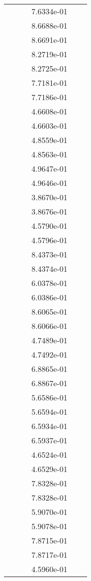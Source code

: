 \begin{xltabular}{\textwidth}{r|rS[table-format=1.3e+2]S[table-format=1.4e+2]S[table-format=1.4e+2]S[table-format=-1.5]}
&  &  & 7.6334e-01 & & \\
&  &  & 8.6688e-01 & & \\
&  &  & 8.6691e-01 & & \\
&  &  & 8.2719e-01 & & \\
&  &  & 8.2725e-01 & & \\
&  &  & 7.7181e-01 & & \\
&  &  & 7.7186e-01 & & \\
&  &  & 4.6608e-01 & & \\
&  &  & 4.6603e-01 & & \\
&  &  & 4.8559e-01 & & \\
&  &  & 4.8563e-01 & & \\
&  &  & 4.9647e-01 & & \\
&  &  & 4.9646e-01 & & \\
&  &  & 3.8670e-01 & & \\
&  &  & 3.8676e-01 & & \\
&  &  & 4.5790e-01 & & \\
&  &  & 4.5796e-01 & & \\
&  &  & 8.4373e-01 & & \\
&  &  & 8.4374e-01 & & \\
&  &  & 6.0378e-01 & & \\
&  &  & 6.0386e-01 & & \\
&  &  & 8.6065e-01 & & \\
&  &  & 8.6066e-01 & & \\
&  &  & 4.7489e-01 & & \\
&  &  & 4.7492e-01 & & \\
&  &  & 6.8865e-01 & & \\
&  &  & 6.8867e-01 & & \\
&  &  & 5.6586e-01 & & \\
&  &  & 5.6594e-01 & & \\
&  &  & 6.5934e-01 & & \\
&  &  & 6.5937e-01 & & \\
&  &  & 4.6524e-01 & & \\
&  &  & 4.6529e-01 & & \\
&  &  & 7.8328e-01 & & \\
&  &  & 7.8328e-01 & & \\
&  &  & 5.9070e-01 & & \\
&  &  & 5.9078e-01 & & \\
&  &  & 7.8715e-01 & & \\
&  &  & 7.8717e-01 & & \\
&  &  & 4.5960e-01 & & \\

\end{xltabular}
